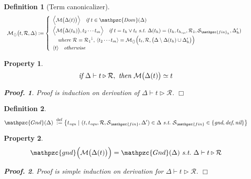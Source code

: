 \documentclass[12pt]{article}
\newtheorem{Definition}{Definition}[section]
\newtheorem{Property}{Property}[section]
\newtheorem{Proof}{Proof.}
\begin{document}
\begin{Definition}[Term canonicalizer]
\begin{displaymath}
\begin{array}{l}
     \mathcal{M}_{\langle\rangle}\bigl(t, \mathcal{R},\Delta) :=
     \left\{\begin{array}{l}
       \Bigl\langle\mathcal{M}\bigl(\Delta(t) \bigr) \Bigr\rangle
        \quad \text{\it if}\ t \in \mathpzc{Dom}(\Delta)  \\ [5pt]
       \Bigl\langle\mathcal{M}\bigl(\Delta(t_h) \bigr), t_2 \cdots t_m
        \Bigr\rangle \quad \text{\it if}\ t = t_h \vee t_t\ \text{\it s.t.}\
         \Delta(t_h) = (t_h, t_{h_{\text{\it equ}}}, \mathcal{R}_1,
          \mathcal{S}_{\mathpzc{fin}_h}, \Delta'_h)  \\
       \quad \text{\it where}\ \mathcal{R} = {\mathcal{R}_1}^\downarrow,\,
        \langle t_2 \cdots t_m\rangle =
         \mathcal{M}_{\langle\rangle}\Bigl(t_t, \mathcal{R}, \bigl(
          \Delta \setminus \Delta(t_h) \cup \Delta'_h \bigr) \Bigr)  \\
       \langle t \rangle \quad \text{\it otherwise}
     \end{array}\right.
    \end{array}
  \end{displaymath}
\end{Definition}


\begin{Property}
  \label{equality_over_transduction}
  \[ \text{\it if}\ \Delta \vdash t \triangleright \mathcal{R},\
      \text{\it then}\ \mathcal{M}\bigl(\Delta(t) \bigr) \simeq t
  \]
  \begin{Proof}
    Proof is induction on derivation of
    $\Delta \vdash t \triangleright \mathcal{R}$.
    $\Box$
  \end{Proof}
\end{Property}


\begin{Definition}
  \[ \mathpzc{Gnd}(\Delta) \;\stackrel{\mathrm{def}}{:=}
      \bigl\{t_{\text{\it equ}}\ |\ (t, t_{\text{\it equ}}, \mathcal{R},
       \mathcal{S}_{\mathpzc{fin}}, \Delta') \in \Delta\ \text{\it s.t.}\
        \mathcal{S}_{\mathpzc{fin}} \in \{\text{\it gnd}, \text{\it def},
         \text{\it nil} \} \bigr\}
  \]
\end{Definition}


\begin{Property}
  \label{consistency_on_grand_terms}
  \[ \mathpzc{gnd}\Bigl(\mathcal{M}\bigl(\Delta(t) \bigr) \Bigr) =
      \mathpzc{Gnd}(\Delta)\ \text{\it s.t.}\
       \Delta \vdash t \triangleright \mathcal{R}
  \]
  \begin{Proof}
    Proof is simple induction on derivation for
    $\Delta \vdash t \triangleright \mathcal{R}$.
    $\Box$
  \end{Proof}
\end{Property}
\end{document}
